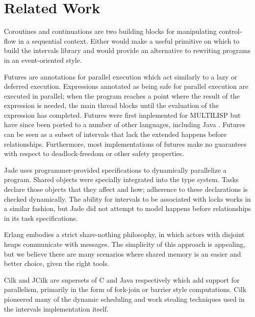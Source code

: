 

\section{Related Work}
\label{sec:queues-conclusion-related-work}


Coroutines \cite{Conway1963} and continuations \cite{Reynolds1993} are
two building blocks for manipulating control-flow in a sequential
context. Either would make a useful primitive on which to build the
intervals library and would provide an alternative to rewriting
programs in an event-oriented style.

Futures are annotations for parallel execution which act similarly to
a lazy or deferred execution. Expressions annotated as being safe for
parallel execution are executed in parallel; when the program reaches
a point where the result of the expression is needed, the main thread
blocks until the evaluation of the expression has completed. Futures
were first implemented for MULTILISP \cite{Halstead1985} but have
since been ported to a number of other languages, including Java
\cite{Navabi2008}.  Futures can be seen as a subset of intervals that
lack the extended happens before relationships. Furthermore, most
implementations of futures make no guarantees with respect to
deadlock-freedom or other safety properties.

Jade \cite{Rinard1998} uses programmer-provided specifications to
dynamically parallelize a program. Shared objects were specially
integrated into the type system. Tasks declare those objects that they
affect and how; adherence to these declarations is checked
dynamically. The ability for intervals to be associated with locks
works in a similar fashion, but Jade did not attempt to model happens
before relationships in its task specifications.

Erlang \cite{Erlang2010} embodies a strict share-nothing philosophy,
in which actors with disjoint heaps communicate with messages. The
simplicity of this approach is appealing, but we believe there are
many scenarios where shared memory is an easier and better choice,
given the right tools.

Cilk \cite{Blumofe1995, Frigo1998} and JCilk \cite{Danaher2005} are
supersets of C and Java respectively which add support for
parallelism, primarily in the form of fork-join or barrier style
computations. Cilk pioneered many of the dynamic scheduling and work
stealing techniques used in the intervals implementation itself.

